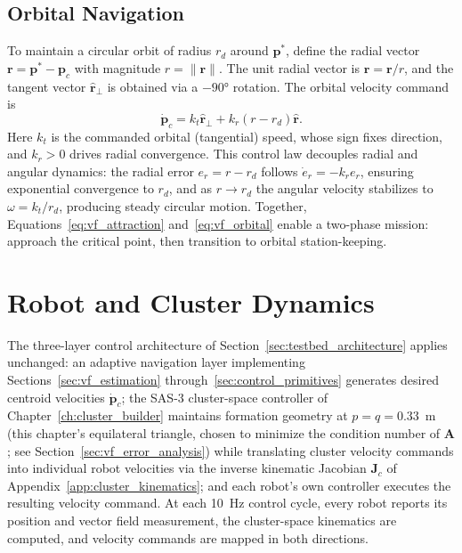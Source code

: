 \documentclass[12pt, letterpaper, oneside]{report}
\begin{document}
\subsection{Orbital Navigation}

To maintain a circular orbit of radius $r_d$ around $\mathbf{p}^*$, define
the radial vector $\mathbf{r}=\mathbf{p}^*-\mathbf{p}_c$ with magnitude
$r=\lVert\mathbf{r}\rVert$. The unit radial vector is
$\hat{\mathbf{r}}=\mathbf{r}/r$, and the tangent vector
$\hat{\mathbf{r}}_\perp$ is obtained via a $-90°$ rotation. The orbital
velocity command is
\begin{equation}
\dot{\mathbf{p}}_c = k_t\hat{\mathbf{r}}_\perp + k_r(r-r_d)\hat{\mathbf{r}}.
\label{eq:vf_orbital}
\end{equation}
Here $k_t$ is the commanded orbital (tangential) speed, whose sign fixes
direction, and $k_r>0$ drives radial convergence. This control law decouples
radial and angular dynamics: the radial error $e_r=r-r_d$ follows
$\dot e_r=-k_re_r$, ensuring exponential convergence to $r_d$, and as
$r\to r_d$ the angular velocity stabilizes to $\omega=k_t/r_d$, producing
steady circular motion. Together, Equations~\eqref{eq:vf_attraction}
and~\eqref{eq:vf_orbital} enable a two-phase mission: approach the critical
point, then transition to orbital station-keeping.

\section{Robot and Cluster Dynamics}
\label{sec:vf_dynamics}

The three-layer control architecture of
Section~\ref{sec:testbed_architecture} applies unchanged: an adaptive
navigation layer implementing Sections~\ref{sec:vf_estimation}
through~\ref{sec:control_primitives} generates desired centroid velocities
$\dot{\mathbf{p}}_c$; the SAS-3 cluster-space controller of
Chapter~\ref{ch:cluster_builder} maintains formation geometry at
$p=q=0.33$~m (this chapter's equilateral triangle, chosen to minimize the
condition number of $\mathbf{A}$; see Section~\ref{sec:vf_error_analysis})
while translating cluster velocity commands into individual robot
velocities via the inverse kinematic Jacobian $\mathbf{J}_c$ of
Appendix~\ref{app:cluster_kinematics}; and each robot's own controller
executes the resulting velocity command. At each 10~Hz control cycle, every
robot reports its position and vector field measurement, the cluster-space
kinematics are computed, and velocity commands are mapped in both
directions.
\end{document}
